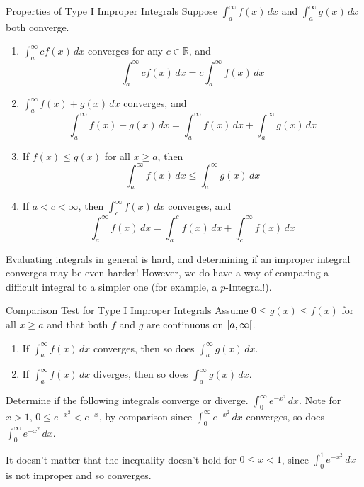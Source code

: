 \begin{Theorem}{Properties of Type I Improper Integrals}{}
    Suppose $ \int_{a}^{\infty} f(x)\, d{x}  $ and $ \int_{a}^{\infty} g(x)\, d{x}  $
    both converge.
    \begin{enumerate}[label=(\arabic*)]
        \item $ \int_{a}^{\infty} cf(x)\, d{x} $
              converges for any $ c\in\mathbb{R} $, and
              \[ \int_{a}^{\infty} cf(x)\, d{x} =c \int_{a}^{\infty} f(x)\, d{x} \]
        \item $ \int_{a}^{\infty} f(x)+g(x)\, d{x} $
              converges, and
              \[ \int_{a}^{\infty} f(x)+g(x)\, d{x}=
                  \int_{a}^{\infty} f(x)\, d{x} +\int_{a}^{\infty} g(x)\, d{x} \]
        \item If $ f(x)\leqslant g(x) $ for all $ x\geqslant a $, then
              \[ \int_{a}^{\infty} f(x)\, d{x} \leqslant \int_{a}^{\infty} g(x)\, d{x} \]
        \item If $ a<c<\infty $, then $ \int_{c}^{\infty} f(x)\, d{x} $ converges, and
              \[ \int_{a}^{\infty} f(x)\, d{x}=
                  \int_{a}^{c} f(x)\, d{x} +\int_{c}^{\infty} f(x)\, d{x} \]
    \end{enumerate}
\end{Theorem}
Evaluating integrals in general is hard, and determining if an improper integral converges
may be even harder! However, we do have a way of comparing a difficult
integral to a simpler one (for example, a $ p $-Integral!).

\begin{Theorem}{Comparison Test for Type I Improper Integrals}{}
    Assume $ 0\leqslant g(x)\leqslant f(x) $ for all $ x\geqslant a $
    and that both $ f $ and $ g $ are continuous on $ \interval[open right]{a}{\infty} $.
    \begin{enumerate}[label=(\arabic*)]
        \item If $ \int_a^{\infty}f(x)\, d{x} $ converges, then so does
              $ \int_a^{\infty}g(x)\, d{x} $.
        \item If $ \int_a^{\infty}f(x)\, d{x} $ diverges, then so does
              $ \int_a^{\infty}g(x)\, d{x} $.
    \end{enumerate}
\end{Theorem}
\begin{Example}{}{}
    Determine if the following integrals converge or diverge.
    $ \int_0^\infty e^{-x^2}\, d{x} $. Note for $ x>1 $,
    $ 0\leqslant e^{-x^2} <e^{-x} $, by comparison since
    $ \int_{0}^{\infty} e^{-x^2}\, d{x} $ converges, so does
    $ \int_{0}^{\infty} e^{-x^2}\, d{x} $.
\end{Example}
\begin{Remark}{}{}
    It doesn't matter that the inequality doesn't hold for $ 0\leqslant x<1 $,
    since $ \int_{0}^{1}e^{-x^2} \, d{x} $ is not improper and so converges.
\end{Remark}

